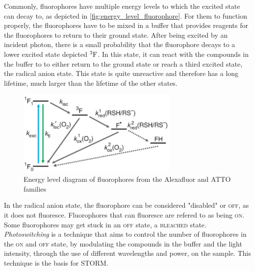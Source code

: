 Commonly, fluorophores have multiple energy levels to which the excited state can decay to, as depicted in \autoref{fig:energy_level_fluorophore}. For them to function properly, the fluorophores have to be mixed in a buffer that provides reagents for the fluorophores to return to their ground state. After being excited by an incident photon, there is a small probability that the fluorophore decays to a lower excited state depicted $^3\textrm F$. In this state, it can react with the compounds in the buffer to to either return to the ground state or reach a third excited state, the radical anion state. This state is quite unreactive and therefore has a long lifetime, much larger than the lifetime of the other states.
\begin{figure}[htbp]
    \centering
    \includegraphics[width=0.7\textwidth]{figures/alexafluor-jablonski-diagram.png}
    \caption{Energy level diagram of fluorophores from the Alexafluor and ATTO families \cite{vandelinde-natureprotocols-2011}}
    \label{fig:energy_level_fluorophore}
\end{figure}

In the radical anion state, the fluorophore can be considered "disabled" or \textsc{off}, as it does not fluoresce. Fluorophores that can fluoresce are refered to as being \textsc{on}. Some fluorophores may get stuck in an \textsc{off} state, a \textsc{bleached} state. \emph{Photoswitching} is a technique that aims to control the number of fluorophores in the \textsc{on} and \textsc{off} state, by modulating the compounds in the buffer and the light intensity, through the use of different wavelengths and power, on the sample. This technique is the basis for STORM.

